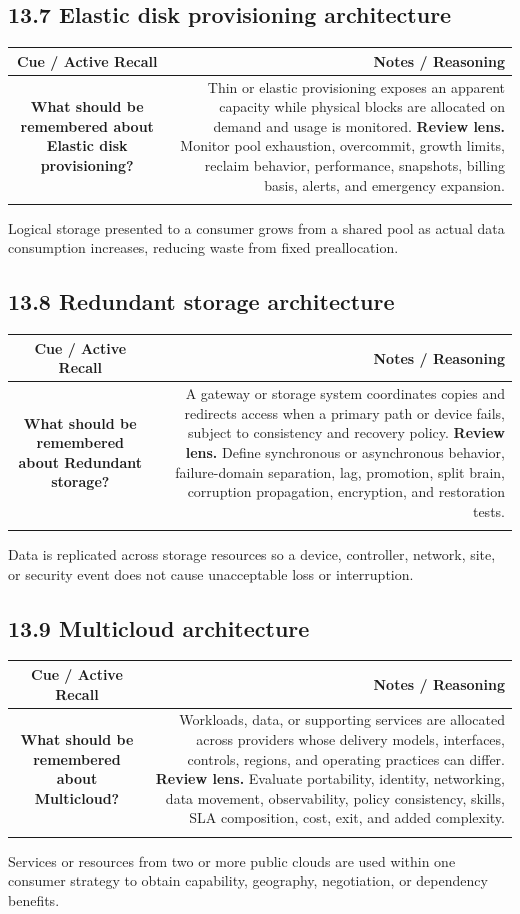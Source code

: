 \documentclass[11pt]{article}
\newcommand{\CornellHeader}{\rowcolor{Navy}\color{white}\bfseries Cue / Active Recall & \color{white}\bfseries Notes / Reasoning \\\endhead}
\newcommand{\CornellRow}[2]{\cellcolor{CueGray}\textbf{#1} & #2 \\\addlinespace[3pt]}
\begin{document}
\subsection{13.7 Elastic disk provisioning architecture}
\begin{longtable}{@{}C N@{}}
\CornellHeader
\CornellRow{What should be remembered about Elastic disk provisioning?}{Thin or elastic provisioning exposes an apparent capacity while physical blocks are allocated on demand and usage is monitored. \textbf{Review lens.} Monitor pool exhaustion, overcommit, growth limits, reclaim behavior, performance, snapshots, billing basis, alerts, and emergency expansion.}
\end{longtable}
\begin{sectionsummarybox}
Logical storage presented to a consumer grows from a shared pool as actual data consumption increases, reducing waste from fixed preallocation.
\end{sectionsummarybox}
\subsection{13.8 Redundant storage architecture}
\begin{longtable}{@{}C N@{}}
\CornellHeader
\CornellRow{What should be remembered about Redundant storage?}{A gateway or storage system coordinates copies and redirects access when a primary path or device fails, subject to consistency and recovery policy. \textbf{Review lens.} Define synchronous or asynchronous behavior, failure-domain separation, lag, promotion, split brain, corruption propagation, encryption, and restoration tests.}
\end{longtable}
\begin{sectionsummarybox}
Data is replicated across storage resources so a device, controller, network, site, or security event does not cause unacceptable loss or interruption.
\end{sectionsummarybox}
\subsection{13.9 Multicloud architecture}
\begin{longtable}{@{}C N@{}}
\CornellHeader
\CornellRow{What should be remembered about Multicloud?}{Workloads, data, or supporting services are allocated across providers whose delivery models, interfaces, controls, regions, and operating practices can differ. \textbf{Review lens.} Evaluate portability, identity, networking, data movement, observability, policy consistency, skills, SLA composition, cost, exit, and added complexity.}
\end{longtable}
\begin{sectionsummarybox}
Services or resources from two or more public clouds are used within one consumer strategy to obtain capability, geography, negotiation, or dependency benefits.
\end{sectionsummarybox}
\end{document}
